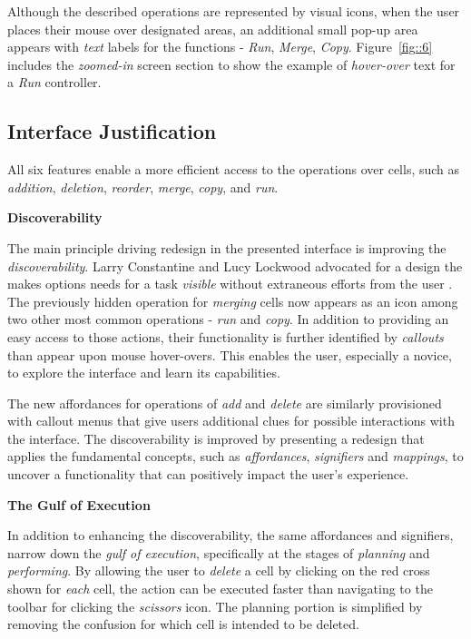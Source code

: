 \documentclass[12pt,letterpaper]{article}
\begin{document}
Although the described operations are represented by visual icons, when the user places their mouse over designated areas, an additional small pop-up area appears with \textit{text} labels for the functions - \textit{Run}, \textit{Merge}, \textit{Copy}. Figure~\ref{fig::6} includes the \textit{zoomed-in} screen section to show the example of \textit{hover-over} text for a \textit{Run} controller.



\subsection*{Interface Justification}
All six features enable a more efficient access to the operations over cells, such as \textit{addition}, \textit{deletion}, \textit{reorder}, \textit{merge}, \textit{copy}, and \textit{run}.

\textbf{Discoverability}

The main principle driving redesign in the presented interface  is improving the \textit{discoverability}. Larry Constantine and Lucy Lockwood advocated for a design the makes options needs for a task \textit{visible} without extraneous efforts from the user \cite{jayasimman2011dynamic}. The previously hidden operation for \textit{merging} cells now appears as an icon among two other most common operations - \textit{run} and \textit{copy}. In addition to providing an easy access to those actions, their functionality is further identified by \textit{callouts} than appear upon mouse hover-overs. This enables the user, especially a novice, to explore the interface and learn its capabilities. 

The new affordances for operations of \textit{add} and \textit{delete} are similarly provisioned with callout menus that give users additional clues for possible interactions with the interface. The discoverability is improved by presenting a redesign that applies the fundamental concepts, such as \textit{affordances}, \textit{signifiers} and \textit{mappings}, to uncover a functionality that can positively impact the user's experience. 

\textbf{The Gulf of Execution}

In addition to enhancing the discoverability, the same affordances and signifiers, narrow down the \textit{gulf of execution}, specifically at the stages of \textit{planning} and \textit{performing}. By allowing the user to \textit{delete} a cell by clicking on the red cross shown for \textit{each} cell, the action can be executed faster than navigating to the toolbar for clicking the \textit{scissors} icon. The planning portion is simplified by removing the confusion for which cell is intended to be deleted. 
\end{document}
